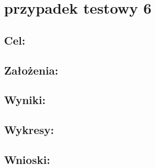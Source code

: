\section{przypadek testowy 6}
\subsection{Cel: }
\subsection{Założenia: }
\subsection{Wyniki: }
\subsection{Wykresy: }
\subsection{Wnioski: }


